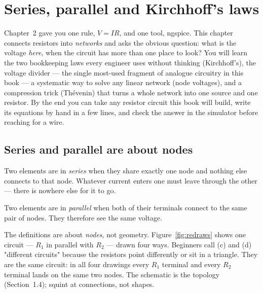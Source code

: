 \chapter{Series, parallel and Kirchhoff's laws}
\label{ch:networks}

Chapter~2 gave you one rule, $V=IR$, and one tool, ngspice. This chapter
connects resistors into \emph{networks} and asks the obvious question: what is
the voltage \emph{here}, when the circuit has more than one place to look?
You will learn the two bookkeeping laws every engineer uses without thinking
(Kirchhoff's), the voltage divider — the single most-used fragment of analogue
circuitry in this book — a systematic way to solve any linear network
(node voltages), and a compression trick (Th\'evenin) that turns a whole
network into one source and one resistor. By the end you can take any
resistor circuit this book will build, write its equations by hand in a few
lines, and check the answer in the simulator before reaching for a wire.

\section{Series and parallel are about nodes}
\label{sec:seriesparallel}

\begin{definition}[Series]
Two elements are in \emph{series} when they share exactly one node and nothing
else connects to that node. Whatever current enters one must leave through
the other — there is nowhere else for it to go.
\end{definition}

\begin{definition}[Parallel]
Two elements are in \emph{parallel} when both of their terminals connect to the
same pair of nodes. They therefore see the same voltage.
\end{definition}

The definitions are about \emph{nodes}, not geometry. Figure~\ref{fig:redraws}
shows one circuit — $R_1$ in parallel with $R_2$ — drawn four ways. Beginners
call (c) and (d) "different circuits" because the resistors point differently
or sit in a triangle. They are the same circuit: in all four drawings every
$R_1$ terminal and every $R_2$ terminal lands on the same two nodes. The
schematic is the topology (Section~1.4); squint at connections, not shapes.

